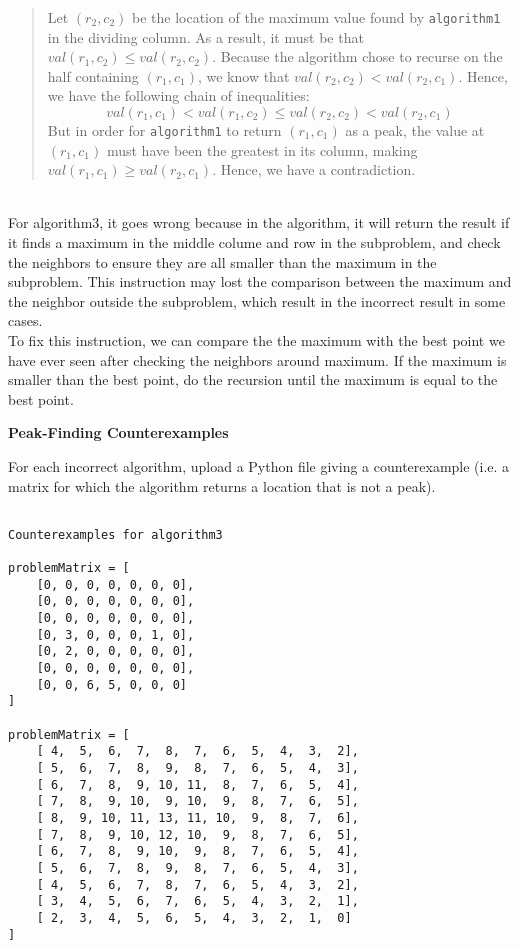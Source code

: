 \documentclass[12pt,twoside]{article}
\begin{document}
\begin{problems}
\begin{quote}
Let $(r_2, c_2)$ be
the location of the maximum value found by \texttt{algorithm1}
in the dividing column.
As a result, it must be that $val(r_1, c_2) \le val(r_2, c_2)$.
Because the algorithm chose to recurse
on the half containing $(r_1, c_1)$,
we know that $val(r_2, c_2) < val(r_2, c_1)$.
Hence, we have the following chain of inequalities:
$$val(r_1, c_1) < val(r_1, c_2) \le val(r_2, c_2) < val(r_2, c_1)$$
But in order for \texttt{algorithm1} to return $(r_1, c_1)$ as a peak,
the value at $(r_1, c_1)$ must have been the greatest in its column,
making $val(r_1, c_1) \ge val(r_2, c_1)$.
Hence, we have a contradiction.
\end{quote}

\ifsolution \solution{}
{\color{blue}\\
For algorithm3,  it goes wrong because in the algorithm, it will return 
the result if it finds a maximum in the middle colume and row in the subproblem,
and check the neighbors to ensure they are all smaller than the maximum in the 
subproblem. This instruction may lost the comparison  between the maximum and the 
neighbor outside the subproblem, which result in the incorrect result in some cases.
\\
To fix this instruction, we can compare the the maximum with the best point we have 
ever seen after checking the neighbors around maximum. If the maximum is smaller than 
the best point, do the recursion until the maximum is equal to the best point.
\\}
\fi

\problem {} \textbf{Peak-Finding Counterexamples}

For each incorrect algorithm,
upload a Python file giving a counterexample
(i.e. a matrix for which the algorithm returns a location
that is not a peak).

\ifsolution \solution{}
{\color{blue}
\begin{verbatim}

Counterexamples for algorithm3

problemMatrix = [
    [0, 0, 0, 0, 0, 0, 0],
    [0, 0, 0, 0, 0, 0, 0],
    [0, 0, 0, 0, 0, 0, 0],
    [0, 3, 0, 0, 0, 1, 0],
    [0, 2, 0, 0, 0, 0, 0],
    [0, 0, 0, 0, 0, 0, 0],
    [0, 0, 6, 5, 0, 0, 0]
]

problemMatrix = [
	[ 4,  5,  6,  7,  8,  7,  6,  5,  4,  3,  2],
	[ 5,  6,  7,  8,  9,  8,  7,  6,  5,  4,  3],
	[ 6,  7,  8,  9, 10, 11,  8,  7,  6,  5,  4],
	[ 7,  8,  9, 10,  9, 10,  9,  8,  7,  6,  5],
	[ 8,  9, 10, 11, 13, 11, 10,  9,  8,  7,  6],
	[ 7,  8,  9, 10, 12, 10,  9,  8,  7,  6,  5],
	[ 6,  7,  8,  9, 10,  9,  8,  7,  6,  5,  4],
	[ 5,  6,  7,  8,  9,  8,  7,  6,  5,  4,  3],
	[ 4,  5,  6,  7,  8,  7,  6,  5,  4,  3,  2],
	[ 3,  4,  5,  6,  7,  6,  5,  4,  3,  2,  1],
	[ 2,  3,  4,  5,  6,  5,  4,  3,  2,  1,  0]
]

\end{verbatim}
}

\fi

\end{problems}
\end{document}
